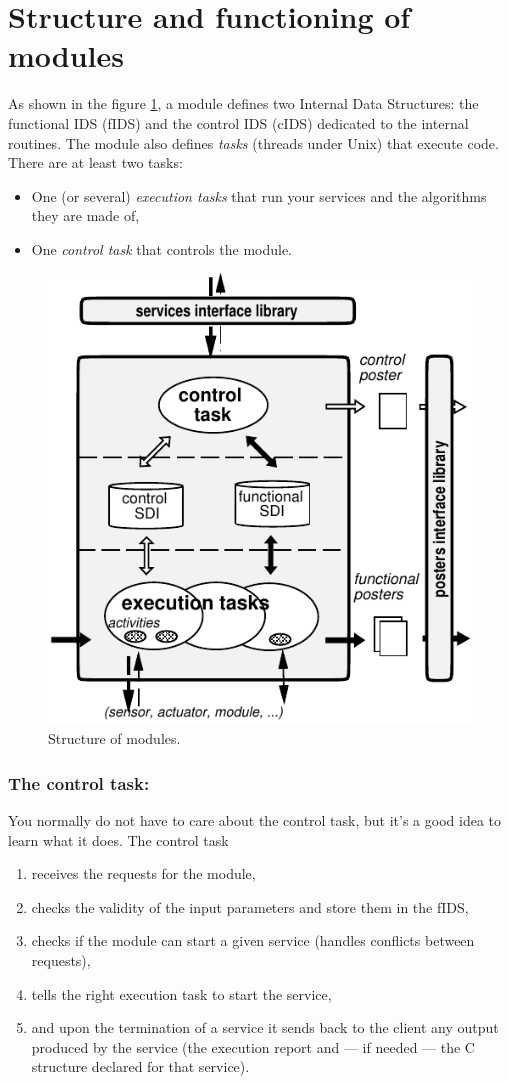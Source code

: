 \section{Structure and functioning of modules}
\label{sec|module|module}

As shown in the figure  \ref{fig|module}, a  module defines two  Internal
Data Structures:  the functional IDS (fIDS)  and  the control  IDS (cIDS)
dedicated to the internal routines.  The module also defines {\em  tasks}
(threads under Unix) that execute code. There are at least two tasks:

\begin{itemize}
\item One (or several) {\em execution tasks} that run your services and
the algorithms they are made of,
\item One {\em control task} that controls the module.
\end{itemize}

\begin{figure}[htbp]
\centering
\includegraphics[width=0.5\hsize]{fig/module-en}
\caption{Structure of modules.}
\label{fig|module}
\end{figure}

\subsubsection{The control task:}

You normally do not have to care about the control task, but it's a good
idea to learn what it does. The control task

\begin{enumerate}
\item receives the requests for the module,
\item checks the validity of the input parameters and store them in the fIDS,
\item checks if the module can start a given service (handles conflicts
between requests),
\item tells the right execution task to start the service,
\item and upon the termination of a service it sends back to the client
any output produced by the service (the execution report and --- if
needed --- the C structure declared for that service).
\end{enumerate}

